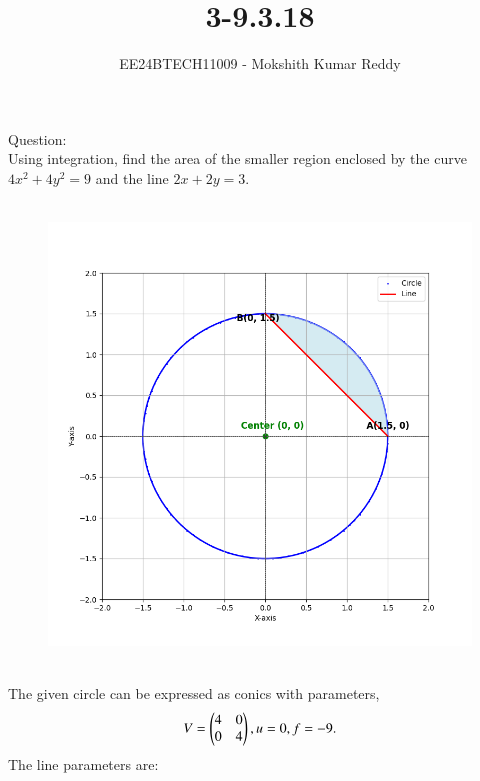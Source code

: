 \documentclass[journal]{IEEEtran}
\begin{document}

\vspace{3cm}

\title{3-9.3.18}
\author{EE24BTECH11009 - Mokshith Kumar Reddy}
{\let\newpage\relax\maketitle}

\renewcommand{\thefigure}{\theenumi}
\renewcommand{\thetable}{\theenumi}
\setlength{\intextsep}{10pt} %


\renewcommand{\thetable}{\theenumi}
Question:\\
Using integration, find the area of the smaller region enclosed by the curve $4x^2 + 4y^2 = 9$ and the line $2x + 2y = 3$.\\
\solution\\
\begin{figure}[h!]
   \centering
   \includegraphics[width=0.7\linewidth]{figs/plot.png}
   \caption{ }
   \label{plot}
\end{figure}\\
The given circle can be expressed as conics with parameters,\\
\begin{align}
    V=\begin{pmatrix}4 & 0\\0 & 4\end{pmatrix},u=0,f=-9.
\end{align}
The line parameters are:\\
\end{document}
